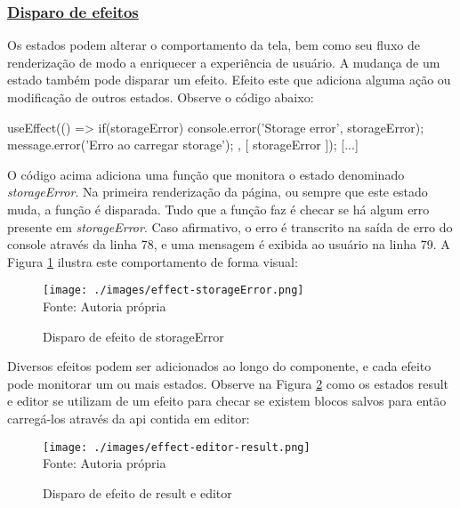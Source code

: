 \subsubsection{\underline{Disparo de efeitos}}

Os estados podem alterar o comportamento da tela, bem como seu fluxo de renderização
de modo a enriquecer a experiência de usuário. A mudança de um estado também pode
disparar um efeito. Efeito este que adiciona alguma ação ou modificação de outros estados.
Observe o código abaixo:

\begin{Code32f97f1df6004290907bfbbdf930639d}
[...]
useEffect(() => {
    if(storageError){
        console.error('Storage error', storageError);
        message.error('Erro ao carregar storage');
    }
}, [ storageError ]);
[...]
\end{Code32f97f1df6004290907bfbbdf930639d}

O código acima adiciona uma função que monitora o estado denominado
\textit{storageError}. Na primeira renderização da página, ou sempre que este
estado muda, a função é disparada. Tudo que a função faz é checar se há
algum erro presente em \textit{storageError}. Caso afirmativo, o erro é transcrito
na saída de erro do console através da linha 78, e uma mensagem
é exibida ao usuário na linha 79.
A
Figura \ref{fig:effect-storageError}
ilustra este comportamento de forma visual:

\begin{figure}[H]
    \centering
    \caption{Disparo de efeito de storageError}
    \texttt{[image: ./images/effect-storageError.png]}
    \label{fig:effect-storageError} \\
    \textnormal{\fontsize{10pt}{12pt}Fonte: Autoria própria}
\end{figure}

Diversos efeitos podem ser adicionados ao longo do componente, e cada
efeito pode monitorar um ou mais estados. Observe na
Figura \ref{fig:effect-editor-result}
como os estados
result e editor se utilizam de um efeito para checar se existem blocos
salvos para então carregá-los através da
\acrshort{api}
contida em editor:

\begin{figure}[H]
    \centering
    \caption{Disparo de efeito de result e editor}
    \texttt{[image: ./images/effect-editor-result.png]}
    \label{fig:effect-editor-result} \\
    \textnormal{\fontsize{10pt}{12pt}Fonte: Autoria própria}
\end{figure}

